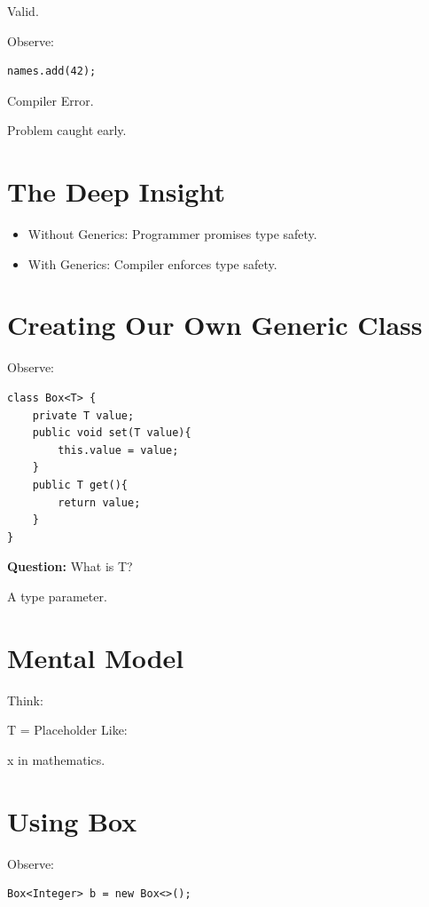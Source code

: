 \documentclass[11pt,a4paper]{book}
\newcommand{\question}[1]{
\vspace{0.5em}
\textbf{Question:} #1?
\vspace{0.2em}
}
\begin{document}
\textcolor{RosettaDeepGreen}{Valid}.

Observe:

\begin{verbatim} 
names.add(42);
\end{verbatim}

\textcolor{RosettaRed}{Compiler Error}.

Problem caught early.

\section{The Deep Insight}
\begin{itemize}
\item [ ]Without Generics:
Programmer promises type safety.
\item [ ]With Generics:
Compiler enforces type safety.
\end{itemize}

\section{Creating Our Own Generic Class}

Observe:

\begin{verbatim} 
class Box<T> {
    private T value;
    public void set(T value){
        this.value = value;
    }
    public T get(){
        return value;
    }
}
\end{verbatim}

\question{What is T}
A type parameter.

\section{Mental Model}

Think:

T = Placeholder Like:

x in mathematics.

\section{Using Box}

Observe:

\begin{verbatim} 
Box<Integer> b = new Box<>();
\end{verbatim}
\end{document}
